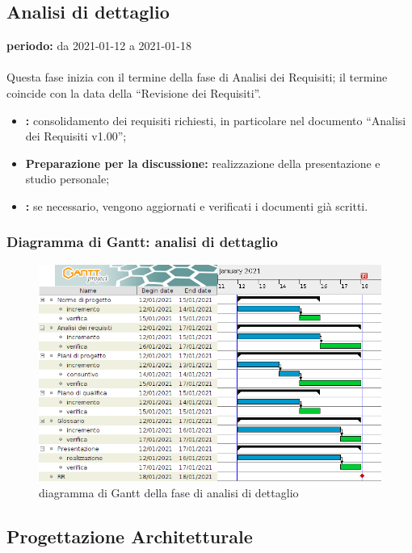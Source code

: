 	
\subsection{Analisi di dettaglio}

	\textbf{periodo:} da 2021-01-12 a 2021-01-18
	\\
	\\
	Questa fase inizia con il termine della fase di Analisi dei Requisiti; il termine coincide con la data della “Revisione dei Requisiti”.
	\begin{itemize}
		\item \textbf{:} consolidamento dei requisiti richiesti, in particolare nel documento “Analisi dei Requisiti v1.00”;
		\item \textbf{Preparazione per la discussione:} realizzazione della presentazione e studio personale;
		\item \textbf{:} se necessario, vengono aggiornati e verificati i documenti già scritti.
	\end{itemize}  

	\subsubsection{Diagramma di Gantt: analisi di dettaglio}

		\begin{figure}[H]
			\centering
			\includegraphics[width=0.7\linewidth]{./res/images/AnalisiDettaglio.png}
			\caption{diagramma di Gantt della fase di analisi di dettaglio}
			\label{fig:diagramma di Gantt della fase di analisi di dettaglio}
		\end{figure}
	
	
\subsection{Progettazione Architetturale}

